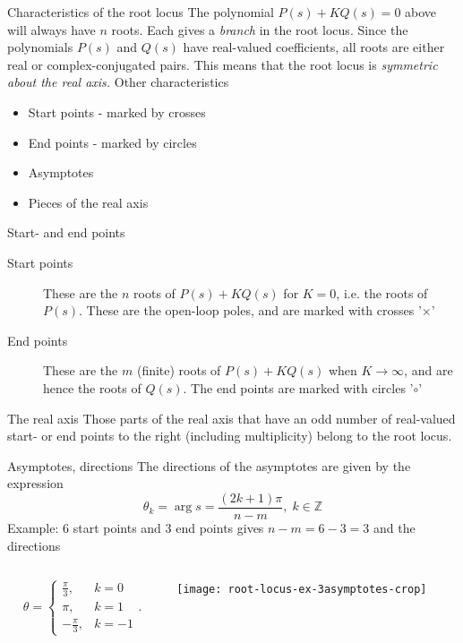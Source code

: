 \documentclass[presentation,aspectratio=169, usenames, dvipsnames]{beamer}
\begin{document}
\begin{frame}[label={sec:org39778df}]{Characteristics of the root locus}
The polynomial \(P(s)+KQ(s)=0\) above will always have \(n\) roots. Each gives a \emph{branch} in the root locus. Since the polynomials \(P(s)\) and \(Q(s)\) have real-valued coefficients, all roots are either real or complex-conjugated pairs. This means that the root locus is \emph{symmetric about the real axis.} Other characteristics
\begin{itemize}
\item Start points - marked by crosses
\item End points - marked  by circles
\item Asymptotes
\item Pieces of the real axis
\end{itemize}
\end{frame}

\begin{frame}[label={sec:org30616d2}]{Start- and end points}
\begin{description}
\item[{Start points}] These are the \(n\) roots of \(P(s) + KQ(s)\) for \(K=0\), i.e. the roots of \(P(s)\). These are the open-loop poles, and are marked with crosses '\(\times\)'
\item[{End points}] These are the \(m\) (finite) roots of \(P(s)+KQ(s)\) when \(K\to\infty\), and are hence the roots of \(Q(s)\). The end points are marked with circles '\(\circ\)'
\end{description}
\end{frame}

\begin{frame}[label={sec:orgeba0533}]{The real axis}
Those parts of the real axis that have an \alert{odd number} of real-valued start- or end points to the right (including multiplicity) belong to the root locus. 
\end{frame}


\begin{frame}[label={sec:org4bf6958}]{Asymptotes, directions}
The directions of the asymptotes are given by the expression
\[ \theta_k = \arg s = \frac{(2k+1)\pi}{n-m}, \; k \in \mathbb{Z} \]
Example: 6 start points and 3 end points gives \(n-m = 6-3 = 3\) and the directions

\begin{columns}
\begin{column}{0.35\columnwidth}
\[ \theta = \begin{cases} \frac{\pi}{3}, & k=0\\ \pi, & k=1\\ -\frac{\pi}{3}, & k=-1 \end{cases}. \]
\end{column}

\begin{column}{0.65\columnwidth}
\begin{center}
\texttt{[image: root-locus-ex-3asymptotes-crop]}
\end{center}
\end{column}
\end{columns}
\end{frame}
\end{document}
